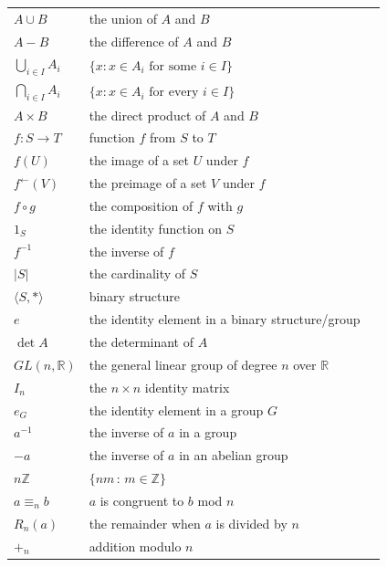 \documentclass[10pt,openany,oneside]{book}
\theoremstyle{plain}
\theoremstyle{definition}
\theoremstyle{definition}
\theoremstyle{definition}
\theoremstyle{definition}
\numberwithin{equation}{section}
\def\Z{\mathbb{Z}}
\def\R{\mathbb{R}}
\begin{document}
\begin{longtable}[l]{lp{}r}
\(A\cup B\)&the union of  \(A\) and \(B\)&\pageref{notation-18}\\
\(A - B\)&the difference of  \(A\) and \(B\)&\pageref{notation-19}\\
\(\bigcup_{i\in I}A_i\)&\(\{x: x\in A_i \text{ for some }  i\in I\}\)&\pageref{notation-20}\\
\(\bigcap_{i\in I}A_i\)&\(\{x: x\in A_i \text{ for every }  i\in I\}\)&\pageref{notation-21}\\
\(A\times B\)&the direct product of  \(A\) and \(B\)&\pageref{notation-22}\\
\(f:S\to T\)&function \(f\) from  \(S\) to  \(T\)&\pageref{notation-23}\\
\(f(U)\)&the image of a set \(U\) under \(f\)&\pageref{notation-24}\\
\(f^{\leftarrow}(V)\)&the preimage of a set \(V\) under \(f\)&\pageref{notation-25}\\
\(f\circ g\)&the composition of  \(f\) with  \(g\)&\pageref{notation-26}\\
\(1_S\)&the identity function on \(S\)&\pageref{notation-27}\\
\(f^{-1}\)&the inverse of \(f\)&\pageref{notation-28}\\
\(|S|\)&the cardinality of  \(S\)&\pageref{notation-29}\\
\(\langle S, *\rangle\)&binary structure&\pageref{notation-30}\\
\(e\)&the identity element in a binary structure/group&\pageref{notation-31}\\
\(\det A\)&the determinant of \(A\)&\pageref{notation-32}\\
\(GL(n,\R)\)&the general linear group of degree \(n\) over \(\R\)&\pageref{notation-33}\\
\(I_n\)&the \(n\times n\) identity matrix&\pageref{notation-34}\\
\(e_G\)&the identity element in a group \(G\)&\pageref{notation-35}\\
\(a^{-1}\)&the inverse of \(a\) in a group&\pageref{notation-36}\\
\(-a\)&the inverse of \(a\) in an abelian group&\pageref{notation-37}\\
\(n\Z\)&\(\{nm\,:\,m\in \Z\}\)&\pageref{notation-38}\\
\(a\equiv_n b\)&\(a\) is congruent to \(b\) mod \(n\)&\pageref{notation-39}\\
\(R_n(a)\)&the remainder when \(a\) is divided by \(n\)&\pageref{notation-40}\\
\(+_n\)&addition modulo \(n\)&\pageref{notation-41}\\

\end{longtable}
\end{document}
